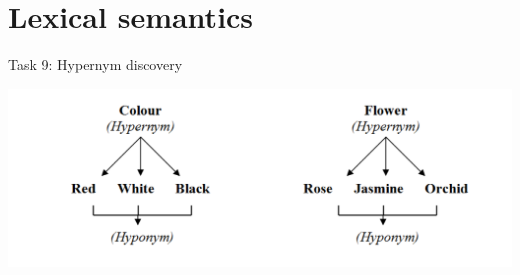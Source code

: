 \documentclass[10pt, compress]{beamer}
\begin{document}
\section{Lexical semantics}

\begin{frame}{Task 9: Hypernym discovery}

\begin{center}
\includegraphics[width=\textwidth]{graphics/hypernymy.png}
\end{center}


\end{frame}
\end{document}
